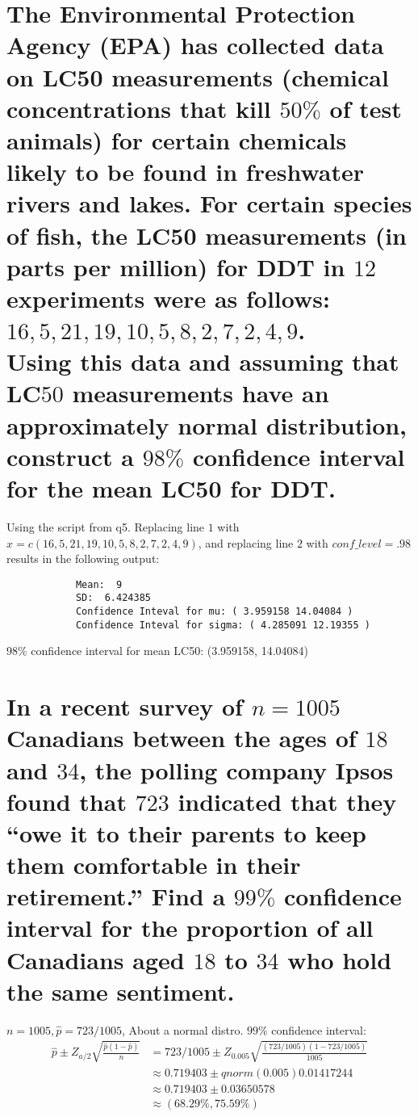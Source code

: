 \documentclass[10pt, letterpaper, titlepage]{article}
\begin{document}
    \section{The Environmental Protection Agency (EPA) has collected data on LC50
        measurements (chemical concentrations that kill $50\%$ of test animals) for certain
        chemicals likely to be found in freshwater rivers and lakes. For certain species of fish,
        the LC50 measurements (in parts per million) for DDT in $12$ experiments were as
        follows: $16, 5, 21, 19, 10, 5, 8, 2, 7, 2, 4, 9$.\\
        Using this data and assuming that LC$50$ measurements have an approximately normal
        distribution, construct a $98\%$ confidence interval for the mean LC50 for DDT.}
        Using the script from q5. Replacing line $1$ with $x = c(16,5,21,19,10,5,8,2,7,2,4,9)$,
        and replacing line $2$ with $conf\_level = .98$ results in the following output:
        \begin{verbatim}
            Mean:  9 
            SD:  6.424385 
            Confidence Inteval for mu: ( 3.959158 14.04084 )
            Confidence Inteval for sigma: ( 4.285091 12.19355 )
        \end{verbatim}
        $98\%$ confidence interval for mean LC50: (3.959158, 14.04084)

    \section{In a recent survey of $n = 1005$ Canadians between the ages of $18$ and $34$, the polling
        company Ipsos found that $723$ indicated that they “owe it to their parents to keep them
        comfortable in their retirement.” Find a $99\%$ confidence interval for the proportion of all
        Canadians aged $18$ to $34$ who hold the same sentiment.}
        $n = 1005, \hat p = 723/1005$, About a normal distro.
        $99\%$ confidence interval:
        \begin{align*}
            \hat p \pm Z_{a/2} \sqrt{\frac{\hat p (1 - \hat p)}{n}}
            &= 723/1005 \pm Z_{0.005} \sqrt{\frac{(723/1005)(1 - 723/1005)}{1005}}\\
            &\approx 0.719403 \pm qnorm(0.005) 0.01417244\\
            &\approx 0.719403 \pm 0.03650578\\
            &\approx (68.29\%, 75.59\%)\\
        \end{align*}
\end{document}
